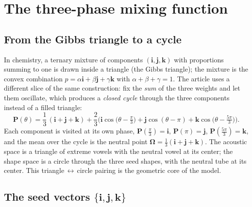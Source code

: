 \documentclass[11pt]{article}
\theoremstyle{definition}
\theoremstyle{remark}
\begin{document}
\section{The three-phase mixing function}

\subsection{From the Gibbs triangle to a cycle}

In chemistry, a ternary mixture of components $(\bm{i},\bm{j},\bm{k})$
with proportions summing to one is drawn inside a triangle (the Gibbs
triangle); the mixture is the convex combination
$p=\alpha\bm{i}+\beta\bm{j}+\gamma\bm{k}$ with
$\alpha+\beta+\gamma=1$.  The article uses a different slice of the same
construction: fix the \emph{sum} of the three weights and let them
oscillate, which produces a \emph{closed cycle} through the three
components instead of a filled triangle:
\begin{equation}
\bm{P}(\theta)=\frac{1}{3}\,(\bm{i}+\bm{j}+\bm{k})
+\frac{2}{3}\Big(\bm{i}\cos\big(\theta-\tfrac{\pi}{3}\big)
+\bm{j}\cos(\theta-\pi)
+\bm{k}\cos\big(\theta-\tfrac{5\pi}{3}\big)\Big).
\label{eq:mixing}
\end{equation}
Each component is visited at its own phase,
$\bm{P}(\tfrac{\pi}{3})=\bm{i}$, $\bm{P}(\pi)=\bm{j}$,
$\bm{P}(\tfrac{5\pi}{3})=\bm{k}$, and the mean over the cycle is the
neutral point $\bm{\Omega}=\frac13(\bm{i}+\bm{j}+\bm{k})$.  The acoustic
space is a triangle of extreme vowels \textipa{[u,\,a,\,i]} with the
neutral vowel \textipa{[@]} at its center; the shape space is a circle
through the three seed shapes, with the neutral tube at its center.  This
triangle$\,\leftrightarrow\,$circle pairing is the geometric core of the
model.

\subsection{The seed vectors \texorpdfstring{$\{\bm{i},\bm{j},\bm{k}\}$}{\{i,j,k\}}}
\end{document}
